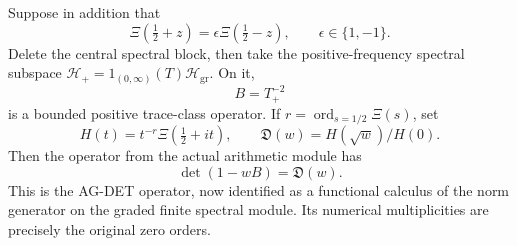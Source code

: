 Suppose in addition that
\[
 \Xi(\tfrac12+z)=\epsilon\Xi(\tfrac12-z),\qquad
       \epsilon\in\{1,-1\}.
                                                               \tag{M29.5}
\]
Delete the central spectral block, then take the
positive-frequency spectral subspace
\(\mathcal H_+=1_{(0,\infty)}(T)\mathcal H_{\mathrm{gr}}\).
On it,
\[
                          B=T_+^{-2}                         \tag{M29.6}
\]
is a bounded positive trace-class operator. If
\(r=\operatorname{ord}_{s=1/2}\Xi(s)\), set
\[
 H(t)=t^{-r}\Xi(\tfrac12+it),\qquad
              \mathfrak D(w)=H(\sqrt w)/H(0).
 \]
Then the operator from the actual arithmetic module has
\[
                       \det(1-wB)=\mathfrak D(w).             \tag{M29.7}
\]
This is the AG-DET operator, now identified as a functional
calculus of the norm generator on the graded finite
spectral module. Its numerical multiplicities are precisely
the original zero orders.

